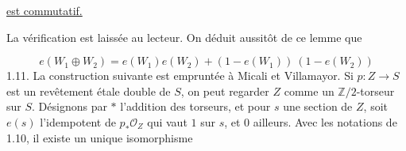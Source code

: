 \begin{center}
\end{center}
\underline{est commutatif.}



La vérification est laissée au lecteur. On déduit aussitôt de ce lemme que

\begin{equation}\tag{1.10.1}
e(W_1 \oplus W_2) = e(W_1)e(W_2) + (1 - e(W_1))\ (1 - e(W_2))
\end{equation}
1.11. La construction suivante est empruntée à Micali et Villamayor. Si $p : Z \longrightarrow S$ est un revêtement étale double de $S$, on peut regarder $Z$ comme un $\mathbb{Z}/2$-torseur sur $S$. Désignons par $*$ l'addition des torseurs, et pour $s$ une section de $Z$, soit $e(s)$ l'idempotent de $p_* \mathcal{O}_Z$ qui vaut $1$ sur $s$, et $0$ ailleurs. Avec les notations de 1.10, il existe un unique isomorphisme

